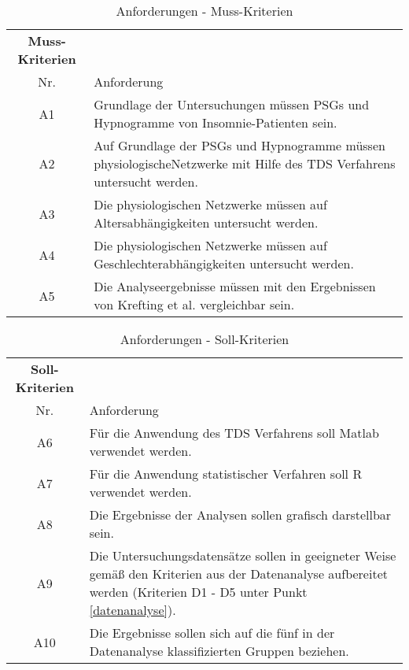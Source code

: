 \begin{table}[H] 
\begin{tabularx}{\textwidth}{cllX}
\toprule
\multicolumn{3}{c}{\textbf{Muss-Kriterien}} & \\  
\cmidrule{1-3}
\multicolumn{3}{c}{Nr.} & Anforderung\\ 
\midrule 
\multicolumn{3}{c}{A1} &  Grundlage der Untersuchungen müssen \acs{PSG}s und Hypnogramme von Insomnie-Patienten sein.\\
\multicolumn{3}{c}{A2} & Auf Grundlage der \acs{PSG}s und Hypnogramme müssen physiologische\newline Netzwerke mit Hilfe des \acs{TDS} Verfahrens untersucht werden.\\
\multicolumn{3}{c}{A3} & Die physiologischen Netzwerke müssen auf Altersabhängigkeiten untersucht werden.\\ 
\multicolumn{3}{c}{A4} & Die physiologischen Netzwerke müssen auf Geschlechterabhängigkeiten untersucht werden.\\
\multicolumn{3}{c}{A5} & Die Analyseergebnisse müssen mit den Ergebnissen von Krefting et al. \parencite{krefting_age_2017} vergleichbar sein.\\
\bottomrule
\end{tabularx}
\caption{Anforderungen - Muss-Kriterien}
\label{tab:Muss-Kriterien}
\end{table}


\begin{table}[H] 
\begin{tabularx}{\textwidth}{cllX}
\toprule
\multicolumn{3}{c}{\textbf{Soll-Kriterien}} & \\  
\cmidrule{1-3}
\multicolumn{3}{c}{Nr.} & Anforderung\\ 
\midrule 
\multicolumn{3}{c}{A6} &  Für die Anwendung des \acs{TDS} Verfahrens soll Matlab verwendet werden.\\
\multicolumn{3}{c}{A7} & Für die Anwendung statistischer Verfahren soll R verwendet werden.\\
\multicolumn{3}{c}{A8} & Die Ergebnisse der Analysen sollen grafisch darstellbar sein.\\ 
\multicolumn{3}{c}{A9} & Die Untersuchungsdatensätze sollen in geeigneter Weise gemäß den Kriterien aus der Datenanalyse aufbereitet werden (Kriterien D1 - D5 unter Punkt \ref{datenanalyse}).\\
\multicolumn{3}{c}{A10} & Die Ergebnisse sollen sich auf die fünf in der Datenanalyse klassifizierten Gruppen beziehen.\\
\bottomrule
\end{tabularx}
\caption{Anforderungen - Soll-Kriterien}
\label{tab:Soll-Kriterien}
\end{table}


